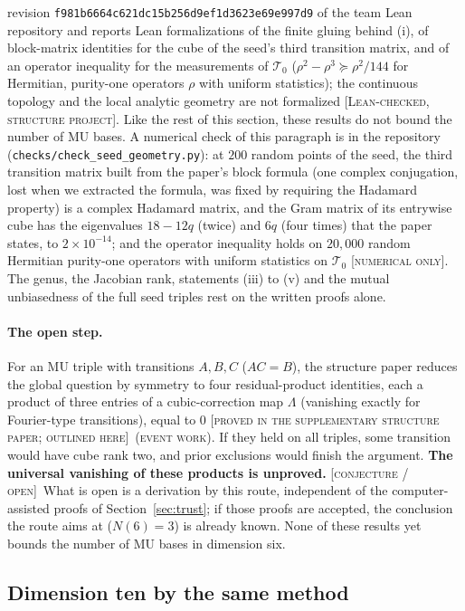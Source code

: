 \documentclass[11pt]{article}
\newcommand{\Tz}{\mathcal{T}_0}          %
\newcommand{\st}[1]{\textsc{[#1]}}
\newcommand{\stlean}{\st{Lean-checked, structure project}}
\newcommand{\stsupp}{\st{proved in the supplementary structure paper; outlined here}}
\newcommand{\stnum}{\st{numerical only}}
\newcommand{\stconj}{\st{conjecture / open}}
\newcommand{\event}{\textsc{(event work)}}
\theoremstyle{definition}
\theoremstyle{remark}
\begin{document}
revision \texttt{f981b6664c621dc15b256d9ef1d3623e69e997d9} of the team Lean repository and reports Lean formalizations
of the finite gluing behind (i), of block-matrix identities for the cube of the seed's third transition matrix, and of
an operator inequality for the measurements of $\Tz$ ($\rho^2-\rho^3\succeq\rho^2/144$ for Hermitian, purity-one operators $\rho$ with uniform
statistics); the continuous topology and the local analytic geometry are not formalized \stlean. Like the rest of
this section, these results do not bound the number of MU bases.
A numerical check of this paragraph is in the repository (\texttt{checks/check\_seed\_geometry.py}):
at $200$ random points of the seed, the third transition matrix built from the paper's block formula (one complex
conjugation, lost when we extracted the formula, was fixed by requiring the Hadamard property) is a complex
Hadamard matrix, and the Gram matrix of its entrywise cube has the eigenvalues $18-12q$ (twice) and $6q$ (four times)
that the paper states, to $2\times10^{-14}$; and the operator inequality holds on $20{,}000$ random Hermitian
purity-one operators with uniform statistics on $\Tz$ \stnum. The genus, the Jacobian rank, statements (iii) to (v)
and the mutual unbiasedness of the full seed triples rest on the written proofs alone.

\paragraph{The open step.}\label{sec:open} For an MU triple with transitions $A,B,C$ ($AC=B$), the structure paper reduces the global question by
symmetry to four residual-product identities, each a product of three entries of a cubic-correction map $\Lambda$
(vanishing exactly for Fourier-type transitions), equal to $0$ \stsupp\ \event. If they held on all triples, some
transition would have cube rank two, and prior exclusions \cite{BW09,JMMSW} would finish the argument. \textbf{The universal vanishing of these products is unproved.} \stconj\ What is open is a derivation by this route, independent of the computer-assisted proofs of Section~\ref{sec:trust}; if those proofs are accepted, the conclusion the route aims at ($N(6)=3$) is already known.
None of these results yet bounds the number of MU bases in dimension six.

\subsection{Dimension ten by the same method}\label{sec:ten}
\end{document}
